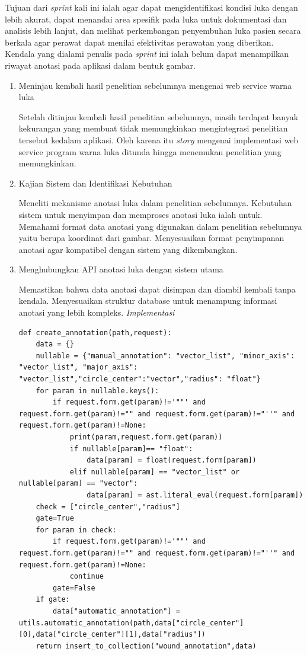 Tujuan dari \textit{sprint} kali ini ialah agar dapat mengidentifikasi kondisi luka dengan lebih akurat, dapat menandai area spesifik pada luka untuk dokumentasi dan analisis lebih lanjut, dan melihat perkembangan penyembuhan luka pasien secara berkala agar perawat dapat menilai efektivitas perawatan yang diberikan. Kendala yang dialami penulis pada \textit{sprint} ini ialah belum dapat menampilkan riwayat anotasi pada aplikasi dalam bentuk gambar.
\begin{enumerate}


\item Meninjau kembali hasil penelitian sebelumnya mengenai web service warna luka

Setelah ditinjau kembali hasil penelitian sebelumnya, masih terdapat banyak kekurangan yang membuat tidak memungkinkan mengintegrasi penelitian tersebut kedalam aplikasi. Oleh karena itu \textit{story} mengenai implementasi web service program warna luka ditunda hingga menemukan penelitian yang memungkinkan.
\item Kajian Sistem dan Identifikasi Kebutuhan

Meneliti mekanisme anotasi luka dalam penelitian sebelumnya. Kebutuhan sistem untuk menyimpan dan memproses anotasi luka ialah untuk. Memahami format data anotasi yang digunakan dalam penelitian sebelumnya yaitu berupa koordinat dari gambar. Menyesuaikan format penyimpanan anotasi agar kompatibel dengan sistem yang dikembangkan.
\item Menghubungkan API anotasi luka dengan sistem utama

Memastikan bahwa data anotasi dapat disimpan dan diambil kembali tanpa kendala. Menyesuaikan struktur database untuk menampung informasi anotasi yang lebih kompleks.
\textit{Implementasi}
\begin{lstlisting}
def create_annotation(path,request):
    data = {}
    nullable = {"manual_annotation": "vector_list", "minor_axis": "vector_list", "major_axis": "vector_list","circle_center":"vector","radius": "float"}
    for param in nullable.keys():
        if request.form.get(param)!='""' and request.form.get(param)!="" and request.form.get(param)!="''" and request.form.get(param)!=None:
            print(param,request.form.get(param))
            if nullable[param]== "float":
                data[param] = float(request.form[param])
            elif nullable[param] == "vector_list" or nullable[param] == "vector":
                data[param] = ast.literal_eval(request.form[param])
    check = ["circle_center","radius"]
    gate=True
    for param in check:
        if request.form.get(param)!='""' and request.form.get(param)!="" and request.form.get(param)!="''" and request.form.get(param)!=None:
            continue
        gate=False
    if gate:
        data["automatic_annotation"] = utils.automatic_annotation(path,data["circle_center"][0],data["circle_center"][1],data["radius"])
    return insert_to_collection("wound_annotation",data)
    

\end{lstlisting}
\end{enumerate}

